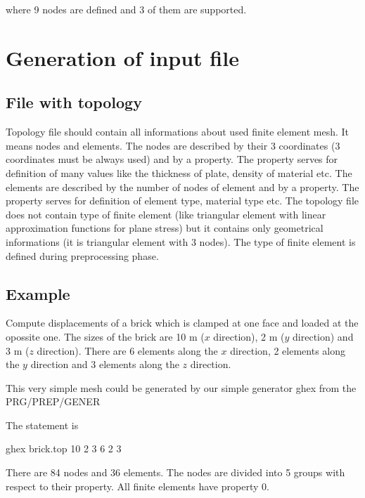 where 9 nodes are defined and 3 of them are supported.


\chapter{Generation of input file}


\section{File with topology}
Topology file should contain all informations about used finite element mesh.
It means nodes and elements. The nodes are described by their 3 coordinates
(3 coordinates must be always used) and by a property. The property serves
for definition of many values like the thickness of plate, density of material etc.
The elements are described by the number of nodes of element and by a property.
The property serves for definition of element type, material type etc. The topology
file does not contain type of finite element (like triangular element with linear
approximation functions for plane stress) but it contains only geometrical
informations (it is triangular element with 3 nodes). The type of finite element
is defined during preprocessing phase.

\section{Example}

Compute displacements of a brick which is clamped at one face and loaded at the
opossite one. The sizes of the brick are 10 m ($x$ direction), 2 m ($y$ direction) and
3 m ($z$ direction). There are 6 elements along the $x$ direction, 2 elements
along the $y$ direction and 3 elements along the $z$ direction.

This very simple mesh could be generated by our simple generator ghex from the
PRG/PREP/GENER

The statement is

ghex brick.top 10 2 3 \hspace{4mm} 6 2 3

There are 84 nodes and 36 elements. The nodes are divided into 5 groups with respect
to their property. All finite elements have property 0.


